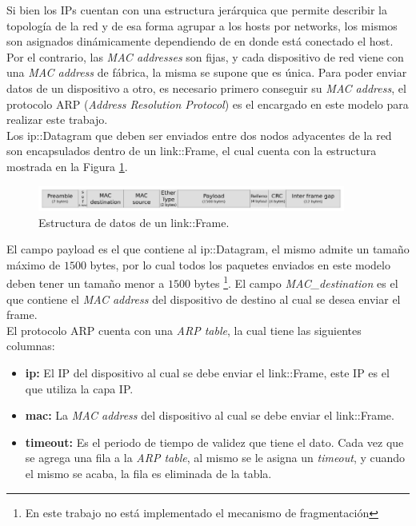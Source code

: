 \documentclass[10pt,a4paper]{article}
\begin{document}
Si bien los IPs cuentan con una estructura jerárquica que permite describir la topología de la red y de esa forma agrupar a los hosts por networks, los mismos son asignados dinámicamente dependiendo de en donde está conectado el host. Por el contrario, las \textit{MAC addresses} son fijas, y cada dispositivo de red viene con una \textit{MAC address} de fábrica, la misma se supone que es única. Para poder enviar datos de un dispositivo a otro, es necesario primero conseguir su \textit{MAC address}, el protocolo ARP (\textit{Address Resolution Protocol}) es el encargado en este modelo para realizar este trabajo. \\

Los ip::Datagram que deben ser enviados entre dos nodos adyacentes de la red son encapsulados dentro de un link::Frame, el cual cuenta con la estructura mostrada en la Figura \ref{figure: frame structure}. \\

\begin{figure}[!htb]
    \centering
    \includegraphics[width = 0.9\textwidth]{img/png/l2-frame.png}
    \caption{Estructura de datos de un link::Frame.}
    \label{figure: frame structure}
\end{figure}

El campo payload es el que contiene al ip::Datagram, el mismo admite un tamaño máximo de $1500$ bytes, por lo cual todos los paquetes enviados en este modelo deben tener un tamaño menor a $1500$ bytes \footnote{En este trabajo no está implementado el mecanismo de fragmentación}. El campo \textit{MAC\_destination} es el que contiene el \textit{MAC address} del dispositivo de destino al cual se desea enviar el frame.\\

El protocolo ARP cuenta con una \textit{ARP table}, la cual tiene las siguientes columnas:

\begin{itemize}
\item \textbf{ip:} El IP del dispositivo al cual se debe enviar el link::Frame, este IP es el que utiliza la capa IP.
\item \textbf{mac:} La \textit{MAC address} del dispositivo al cual se debe enviar el link::Frame.
\item \textbf{timeout:} Es el periodo de tiempo de validez que tiene el dato. Cada vez que se agrega una fila a la \textit{ARP table}, al mismo se le asigna un \textit{timeout}, y cuando el mismo se acaba, la fila es eliminada de la tabla.
\end{itemize}
\end{document}
